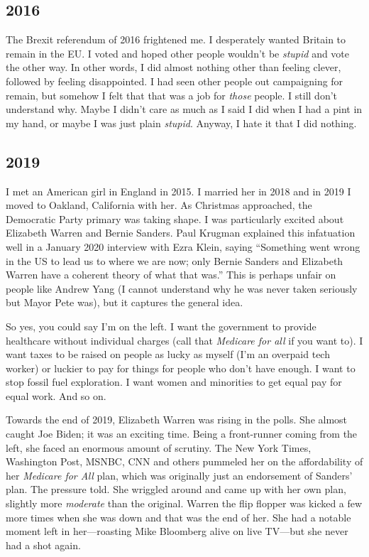 \documentclass[]{book}
\begin{document}
\hypertarget{section}{%
\subsection{2016}\label{section}}

The Brexit referendum of 2016 frightened me. I desperately wanted Britain to remain in the EU. I voted and hoped other people wouldn't be \emph{stupid} and vote the other way. In other words, I did almost nothing other than feeling clever, followed by feeling disappointed. I had seen other people out campaigning for remain, but somehow I felt that that was a job for \emph{those} people. I still don't understand why. Maybe I didn't care as much as I said I did when I had a pint in my hand, or maybe I was just plain \emph{stupid}. Anyway, I hate it that I did nothing.

\hypertarget{section-1}{%
\subsection{2019}\label{section-1}}

I met an American girl in England in 2015. I married her in 2018 and in 2019 I moved to Oakland, California with her. As Christmas approached, the Democratic Party primary was taking shape. I was particularly excited about Elizabeth Warren and Bernie Sanders. Paul Krugman explained this infatuation well in a January 2020 interview with Ezra Klein, saying ``Something went wrong in the US to lead us to where we are now; only Bernie Sanders and Elizabeth Warren have a coherent theory of what that was.'' This is perhaps unfair on people like Andrew Yang (I cannot understand why he was never taken seriously but Mayor Pete was), but it captures the general idea.

So yes, you could say I'm on the left. I want the government to provide healthcare without individual charges (call that \emph{Medicare for all} if you want to). I want taxes to be raised on people as lucky as myself (I'm an overpaid tech worker) or luckier to pay for things for people who don't have enough. I want to stop fossil fuel exploration. I want women and minorities to get equal pay for equal work. And so on.

Towards the end of 2019, Elizabeth Warren was rising in the polls. She almost caught Joe Biden; it was an exciting time. Being a front-runner coming from the left, she faced an enormous amount of scrutiny. The New York Times, Washington Post, MSNBC, CNN and others pummeled her on the affordability of her \emph{Medicare for All} plan, which was originally just an endorsement of Sanders' plan. The pressure told. She wriggled around and came up with her own plan, slightly more \emph{moderate} than the original. Warren the flip flopper was kicked a few more times when she was down and that was the end of her. She had a notable moment left in her---roasting Mike Bloomberg alive on live TV---but she never had a shot again.
\end{document}
